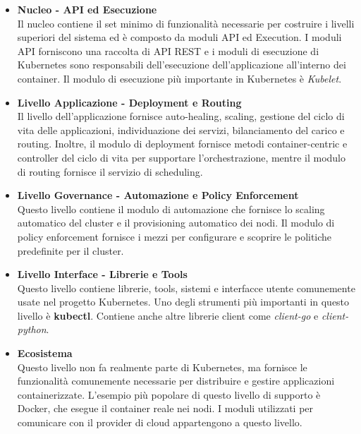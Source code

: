 \documentclass[12pt, a4paper]{report}
\begin{document}
\begin{itemize}
  \item \textbf{Nucleo - API ed Esecuzione}\\
  Il nucleo contiene il set minimo di funzionalità necessarie per costruire i livelli superiori del sistema ed è composto da moduli API ed Execution. I moduli API forniscono una raccolta di API REST e i moduli di esecuzione di Kubernetes sono responsabili dell'esecuzione dell'applicazione all'interno dei container. Il modulo di esecuzione più importante in Kubernetes è \textit{Kubelet}.
  \item \textbf{Livello Applicazione - Deployment e Routing}\\
  Il livello dell'applicazione fornisce auto-healing, scaling, gestione del ciclo di vita delle applicazioni, individuazione dei servizi, bilanciamento del carico e routing. Inoltre, il modulo di deployment fornisce metodi container-centric e controller del ciclo di vita per supportare l'orchestrazione, mentre il modulo di routing fornisce il servizio di scheduling.
  \item \textbf{Livello Governance - Automazione e Policy Enforcement}\\
  Questo livello contiene il modulo di automazione che fornisce lo scaling automatico del cluster e il provisioning automatico dei nodi. Il modulo di policy enforcement fornisce i mezzi per configurare e scoprire le politiche predefinite per il cluster.
  \item \textbf{Livello Interface - Librerie e Tools}\\
  Questo livello contiene librerie, tools, sistemi e interfacce utente comunemente usate nel progetto Kubernetes. Uno degli strumenti più importanti in questo livello è \textbf{kubectl}. Contiene anche altre librerie client come \textit{client-go} e \textit{client-python}.
  \item \textbf{Ecosistema}\\
  Questo livello non fa realmente parte di Kubernetes, ma fornisce le funzionalità comunemente necessarie per distribuire e gestire applicazioni containerizzate. L'esempio più popolare di questo livello di supporto è Docker, che esegue il container reale nei nodi. I moduli utilizzati per comunicare con il provider di cloud appartengono a questo livello.
\end{itemize}
\newpage
\end{document}
